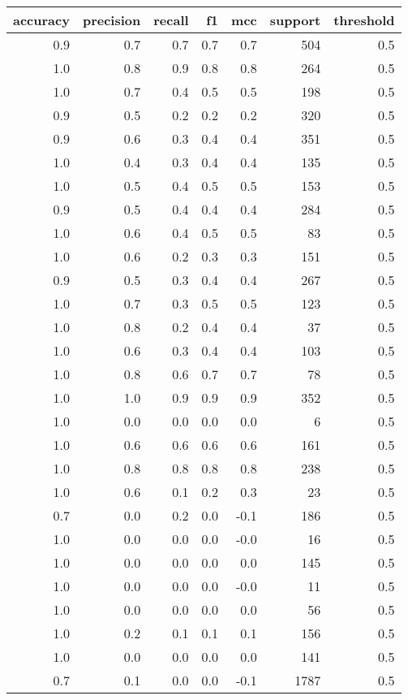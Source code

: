 \begin{tabular}{rrrrrrr}
\toprule
accuracy & precision & recall & f1 & mcc & support & threshold \\
\midrule
0.9 & 0.7 & 0.7 & 0.7 & 0.7 & 504 & 0.5 \\
1.0 & 0.8 & 0.9 & 0.8 & 0.8 & 264 & 0.5 \\
1.0 & 0.7 & 0.4 & 0.5 & 0.5 & 198 & 0.5 \\
0.9 & 0.5 & 0.2 & 0.2 & 0.2 & 320 & 0.5 \\
0.9 & 0.6 & 0.3 & 0.4 & 0.4 & 351 & 0.5 \\
1.0 & 0.4 & 0.3 & 0.4 & 0.4 & 135 & 0.5 \\
1.0 & 0.5 & 0.4 & 0.5 & 0.5 & 153 & 0.5 \\
0.9 & 0.5 & 0.4 & 0.4 & 0.4 & 284 & 0.5 \\
1.0 & 0.6 & 0.4 & 0.5 & 0.5 & 83 & 0.5 \\
1.0 & 0.6 & 0.2 & 0.3 & 0.3 & 151 & 0.5 \\
0.9 & 0.5 & 0.3 & 0.4 & 0.4 & 267 & 0.5 \\
1.0 & 0.7 & 0.3 & 0.5 & 0.5 & 123 & 0.5 \\
1.0 & 0.8 & 0.2 & 0.4 & 0.4 & 37 & 0.5 \\
1.0 & 0.6 & 0.3 & 0.4 & 0.4 & 103 & 0.5 \\
1.0 & 0.8 & 0.6 & 0.7 & 0.7 & 78 & 0.5 \\
1.0 & 1.0 & 0.9 & 0.9 & 0.9 & 352 & 0.5 \\
1.0 & 0.0 & 0.0 & 0.0 & 0.0 & 6 & 0.5 \\
1.0 & 0.6 & 0.6 & 0.6 & 0.6 & 161 & 0.5 \\
1.0 & 0.8 & 0.8 & 0.8 & 0.8 & 238 & 0.5 \\
1.0 & 0.6 & 0.1 & 0.2 & 0.3 & 23 & 0.5 \\
0.7 & 0.0 & 0.2 & 0.0 & -0.1 & 186 & 0.5 \\
1.0 & 0.0 & 0.0 & 0.0 & -0.0 & 16 & 0.5 \\
1.0 & 0.0 & 0.0 & 0.0 & 0.0 & 145 & 0.5 \\
1.0 & 0.0 & 0.0 & 0.0 & -0.0 & 11 & 0.5 \\
1.0 & 0.0 & 0.0 & 0.0 & 0.0 & 56 & 0.5 \\
1.0 & 0.2 & 0.1 & 0.1 & 0.1 & 156 & 0.5 \\
1.0 & 0.0 & 0.0 & 0.0 & 0.0 & 141 & 0.5 \\
0.7 & 0.1 & 0.0 & 0.0 & -0.1 & 1787 & 0.5 \\
\bottomrule
\end{tabular}
